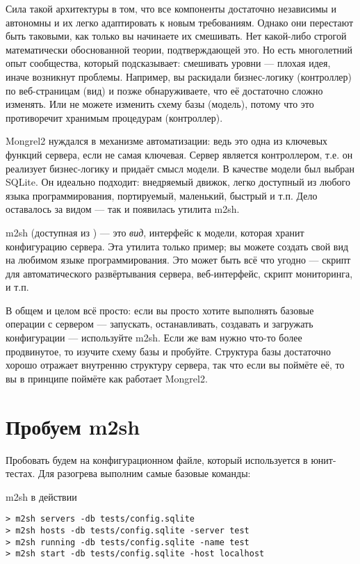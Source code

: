 Сила такой архитектуры в том, что все компоненты достаточно независимы
и автономны и их легко адаптировать к новым требованиям. Однако они
перестают быть таковыми, как только вы начинаете их смешивать.  Нет
какой-либо строгой математически обоснованной теории, подтверждающей
это. Но есть многолетний опыт сообщества, который подсказывает:
смешивать уровни --- плохая идея, иначе возникнут проблемы. Например,
вы раскидали бизнес-логику (контроллер) по веб-страницам (вид) и позже
обнаруживаете, что её достаточно сложно изменять.  Или не можете
изменить схему базы (модель), потому что это противоречит хранимым
процедурам (контроллер).

Mongrel2 нуждался в механизме автоматизации: ведь это одна из ключевых
функций сервера, если не самая ключевая. Сервер является контроллером,
т.е.  он реализует бизнес-логику и придаёт смысл модели. В качестве
модели был выбран SQLite. Он идеально подходит: внедряемый движок,
легко доступный из любого языка программирования, портируемый,
маленький, быстрый и т.п. Дело оставалось за видом --- так и появилась
утилита m2sh.

m2sh (доступная из ) --- это \emph{вид}, интерфейс к модели,
которая хранит конфигурацию сервера. Эта утилита только пример; вы можете
создать свой вид на любимом языке программирования. Это может быть всё что
угодно --- скрипт для автоматического развёртывания сервера, веб-интерфейс,
скрипт мониторинга, и т.п.

В общем и целом всё просто: если вы просто хотите выполнять базовые
операции с сервером --- запускать, останавливать, создавать и
загружать конфигурации --- используйте m2sh. Если же вам нужно что-то
более продвинутое, то изучите схему базы и пробуйте. Структура базы
достаточно хорошо отражает внутренню структуру сервера, так что если
вы поймёте её, то вы в принципе поймёте как работает Mongrel2.

\section{Пробуем m2sh}

Пробовать будем на конфигурационном файле, который используется в
юнит-тестах. Для разогрева выполним самые базовые команды:

\begin{code}{m2sh в действии}
\begin{lstlisting}
> m2sh servers -db tests/config.sqlite
> m2sh hosts -db tests/config.sqlite -server test
> m2sh running -db tests/config.sqlite -name test
> m2sh start -db tests/config.sqlite -host localhost
\end{lstlisting}
\end{code}

